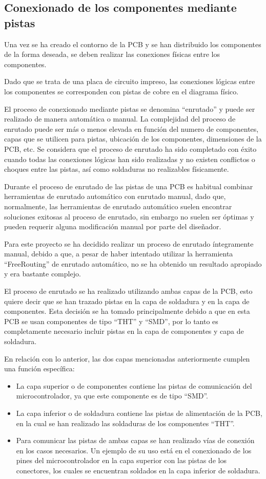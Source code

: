 \subsection{Conexionado de los componentes mediante pistas}
\label{ap:5.4.5}
Una vez se ha creado el contorno de la \ac{PCB} y se han distribuido los componentes de la forma deseada, se deben realizar las conexiones físicas entre los componentes.

Dado que se trata de una placa de circuito impreso, las conexiones lógicas entre los componentes se corresponden con pistas de cobre en el diagrama físico.

El proceso de conexionado mediante pistas se denomina ``enrutado'' y puede ser realizado de manera automática o manual. La complejidad del proceso de enrutado puede ser más o menos elevada en función del numero de componentes, capas que se utilicen para pistas, ubicación de los componentes, dimensiones de la \ac{PCB}, etc. Se considera que el proceso de enrutado ha sido completado con éxito cuando todas las conexiones lógicas han sido realizadas y no existen conflictos o choques entre las pistas, así como soldaduras no realizables físicamente.

Durante el proceso de enrutado de las pistas de una \ac{PCB} es habitual combinar herramientas de enrutado automático con enrutado manual, dado que, normalmente, las herramientas de enrutado automático suelen encontrar soluciones exitosas al proceso de enrutado, sin embargo no suelen ser óptimas y pueden requerir alguna modificación manual por parte del diseñador. 

Para este proyecto se ha decidido realizar un proceso de enrutado íntegramente manual, debido a que, a pesar de haber intentado utilizar la herramienta ``FreeRouting'' de enrutado automático, no se ha obtenido un resultado apropiado y era bastante complejo.

El proceso de enrutado se ha realizado utilizando ambas capas de la \ac{PCB}, esto quiere decir que se han trazado pistas en la capa de soldadura y en la capa de componentes. Esta decisión se ha tomado principalmente debido a que en esta \ac{PCB} se usan componentes de tipo ``\ac{THT}'' y ``\ac{SMD}'', por lo tanto es completamente necesario incluir pistas en la capa de componentes y capa de soldadura.

En relación con lo anterior, las dos capas mencionadas anteriormente cumplen una función específica:
\begin{itemize}
    \item La capa superior o de componentes contiene las pistas de comunicación del microcontrolador, ya que este componente es de tipo ``\ac{SMD}''.
    \item La capa inferior o de soldadura contiene las pistas de alimentación de la \ac{PCB}, en la cual se han realizado las soldaduras de los componentes ``\ac{THT}''.
    \item Para comunicar las pistas de ambas capas se han realizado vías de conexión en los casos necesarios. Un ejemplo de su uso está en el conexionado de los pines del microcontrolador en la capa superior con las pistas de los conectores, los cuales se encuentran soldados en la capa inferior de soldadura.
\end{itemize}

